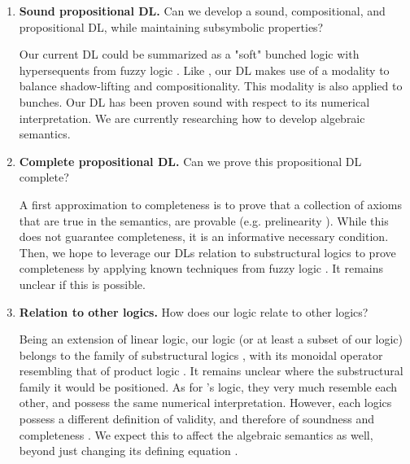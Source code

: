 \begin{enumerate}
    \item \textbf{Sound propositional DL.} Can we develop a sound, compositional, and propositional DL, while maintaining subsymbolic properties? 
    
    Our current DL could be summarized as a "soft" bunched logic \citep{o1999logic} with hypersequents from fuzzy logic \citep{prooffuzzy}. Like \citeauthor{capucci2024quantifiers}, our DL makes use of a modality to balance shadow-lifting and compositionality. This modality is also applied to bunches. Our DL has been proven sound with respect to its numerical interpretation. We are currently researching how to develop algebraic semantics.
    
    \item \textbf{Complete propositional DL.} Can we prove this propositional DL complete?
    
    A first approximation to completeness is to prove that a collection of axioms that are true in the semantics, are provable (e.g. prelinearity \citep{prooffuzzy}). While this does not guarantee completeness, it is an informative necessary condition. Then, we hope to leverage our DLs relation to substructural logics to prove completeness by applying known techniques from fuzzy logic \citep{cintula2011handbook, galatos2007residuated}. It remains unclear if this is possible. 

    
    \item \textbf{Relation to other logics.} How does our logic relate to other logics? 
    
    Being an extension of linear logic, our logic (or at least a subset of our logic) belongs to the family of substructural logics \citep{galatos2007residuated}, with its monoidal operator resembling that of product logic \citep{cintula2011handbook, prooffuzzy}. It remains unclear where the substructural family it would be positioned. As for \citeauthor{capucci2024quantifiers}'s logic, they very much resemble each other, and possess the same numerical interpretation. However, each logics possess a different definition of validity, and therefore of soundness and completeness \citep{galatos2007residuated, capucci2024quantifiers}. We expect this to affect the algebraic semantics as well, beyond just changing its defining equation \citep{galatos2007residuated, agliano2025algebraic}. 
    

\end{enumerate}
